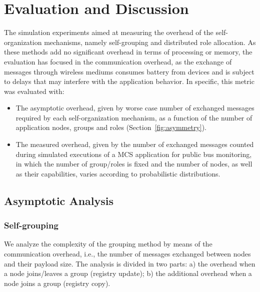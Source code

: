 \section{Evaluation and Discussion}\label{sec:evaluation}



The simulation experiments aimed at measuring the overhead of the self-organization mechanisms, namely self-grouping and distributed role allocation. As these methods add no significant overhead in terms of processing or memory, the evaluation has focused in the communication overhead, as the exchange of messages through wireless mediums consumes battery from devices and is subject to delays that may interfere with the application behavior. In specific, this metric was evaluated with:

\begin{itemize}
	
	\item The asymptotic overhead, given by worse case number of exchanged messages required by each self-organization mechanism, as a function of the number of application nodes, groups and roles (Section~\ref{fig:asymmetry}). 
	
	\item The measured overhead, given by the number of exchanged messages counted during simulated executions of a MCS application for public bus monitoring, in which the number of group/roles is fixed and the number of nodes, as well as their capabilities, varies according to probabilistic distributions.
	
\end{itemize}


\subsection{Asymptotic Analysis} 

\subsubsection{\textbf{Self-grouping}} We analyze the complexity of the grouping method by means of the communication overhead, i.e., the number of messages exchanged between nodes and their payload size. The analysis is divided in two parts: a) the overhead when a node joins/leaves a group (registry update); b) the additional overhead when a node joins a group (registry copy).

